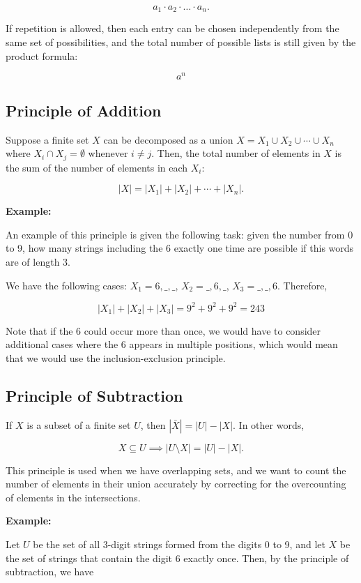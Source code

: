 \[
	a_1 \cdot a_2 \cdot \dots \cdot a_n.
\]

If repetition is allowed, then each entry can be chosen independently from the same set of possibilities, and the total number of possible lists
is still given by the product formula:

\[
	a^n
\]

\subsection{Principle of Addition}

Suppose a finite set \(X\) can be decomposed as a union \(X = X_1 \cup X_2 \cup \cdots \cup X_n\) where
\(X_i \cap X_j = \emptyset\) whenever \(i \neq j\). Then, the total number of elements in \(X\) is the sum of the number of elements in each \(X_i\):

\[
	|X| = |X_1| + |X_2| + \cdots + |X_n|.
\]

\textbf{Example:}

An example of this principle is given the following task: given the number from 0 to 9, how many strings including the 6 exactly one time
are possible if this words are of length 3.

We have the following cases: \(X_1 = 6,\_,\_\), \(X_2 = \_,6,\_\), \(X_3 = \_,\_,6\). Therefore,

\[
	|X_1| + |X_2| + |X_3| = 9^2 + 9^2 + 9^2 = 243
\]

Note that if the 6 could occur more than once, we would have to consider additional cases where the 6 appears in multiple positions, which
would mean that we would use the inclusion-exclusion principle.

\subsection{Principle of Subtraction}

If \(X\) is a subset of a finite set \(U\), then \(|\bar{X}| = |U| - |X|\). In other words,

\[
	X \subseteq U \implies |U \setminus X | = |U| - |X|.
\]

This principle is used when we have overlapping sets, and we want to count the number of elements in their union accurately by correcting for the overcounting
of elements in the intersections.

\textbf{Example:}

Let \(U\) be the set of all 3-digit strings formed from the digits 0 to 9, and let \(X\) be the set of strings that contain the digit 6 exactly once.
Then, by the principle of subtraction, we have

